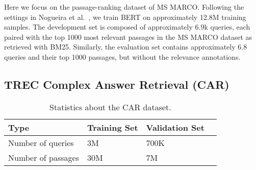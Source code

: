 Here we focus on the passage-ranking dataset of MS MARCO.
Following the settings in Nogueira et al.~\cite{nogueira2019passage}, we train BERT on approximately 12.8M training samples.
The development set is composed of approximately 6.9k queries, each paired with the top 1000 most relevant passages in the MS MARCO dataset as retrieved with BM25.
Similarly, the evaluation set contains approximately 6.8 queries and their top 1000 passages, but without the relevance annotations.

\subsection{TREC Complex Answer Retrieval (CAR)}

\begin{table}[t!]
\vspace{0.2cm}
\centering
\begin{tabular}{llll}
\toprule
\textbf{Type} \mbox{\hspace{0.5cm}} & \textbf{Training Set} \mbox{\hspace{1.0cm}} & \textbf{Validation Set} \mbox{\hspace{1.0cm}} \\
\toprule
Number of queries & 3M & 700K \\
Number of passages & 30M & 7M \\
\bottomrule
\end{tabular}
\vspace{0.2cm}
\caption{Statistics about the CAR dataset.}
\label{tab:car-stats}
\end{table}


